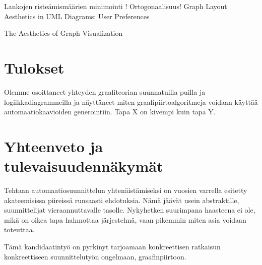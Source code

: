 \documentclass[finnish,12pt]{article}
\begin{document}
Lankojen risteämismäärien minimointi !
Ortogonaalisuus!
Graph Layout Aesthetics in UML Diagrams: User Preferences

The Aesthetics of Graph Visualization

	\clearpage
	\section{Tulokset}
	
Olemme osoittaneet yhteyden graafiteorian suunnatuilla puilla ja
logiikkadiagrammeilla ja näyttäneet miten graafipiirtoalgoritmeja voidaan
käyttää automaatiokaavioiden generointiin.
Tapa X on kivempi kuin tapa Y.

	\section{Yhteenveto ja tulevaisuudennäkymät}

Tehtaan automaatiosuunnittelun yhtenäistämiseksi on vuosien varrella esitetty akateemisissa piireissä
runsaasti ehdotuksia. Nämä jäävät usein abstraktille, suunnittelijat vieraannuttavalle tasolle.
Nykyhetken suurimpana haasteena ei ole, mikä on oikea tapa hahmottaa järjestelmä, vaan pikemmin
miten asia voidaan toteuttaa.

Tämä kandidaatintyö on pyrkinyt tarjoamaan konkreettisen ratkaisun konkreettiseen suunnittelutyön ongelmaan, graafinpiirtoon. 


\clearpage
{}


\end{document}
